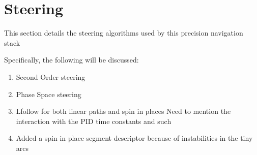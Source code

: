 \section{Steering}

This section details the steering algorithms used by this precision navigation stack

Specifically, the following will be discussed:
\begin{enumerate}
\item Second Order steering
\item Phase Space steering
\item Lfollow for both linear paths and spin in places
	Need to mention the interaction with the PID time constants and such
\item Added a spin in place segment descriptor because of instabilities in the tiny arcs
\end{enumerate}
